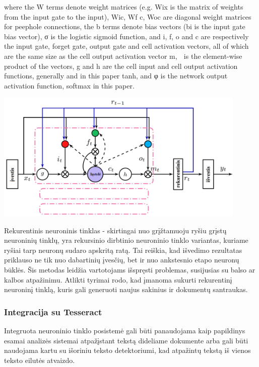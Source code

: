 \documentclass{VUMIFInfBakalaurinis}
\begin{document}
where the W terms denote weight matrices (e.g. Wix is the matrix of weights from the input gate to the input), Wic, Wf c, Woc are diagonal weight matrices for peephole connections, the b
terms denote bias vectors (bi is the input gate bias vector), σ is
the logistic sigmoid function, and i, f, o and c are respectively
the input gate, forget gate, output gate and cell activation vectors, all of which are the same size as the cell output activation
vector m,  is the element-wise product of the vectors, g and h
are the cell input and cell output activation functions, generally
and in this paper tanh, and φ is the network output activation
function, softmax in this paper.
\cite{sak2014long}
\begin{minipage}{\linewidth}
  \centering
  \includegraphics[width=12cm]{memory_block.png}
  \label{memory_block}
\end{minipage}

Rekurentinis neuroninis tinklas - skirtingai nuo grįžtamuoju ryšiu grįstų neuroninių tinklų, yra rekursinio 
dirbtinio neuroninio tinklo variantas, kuriame ryšiai tarp neuronų sudaro apskritą ratą. Tai reiškia,
kad išvedimo rezultatas priklauso ne tik nuo dabartinių įvesčių, bet ir nuo ankstesnio etapo neuronų būklės. 
Šis metodas leidžia vartotojams išspręsti problemas, susijusias su balso ar kalbos atpažinimu.
Atlikti tyrimai rodo, kad įmanoma sukurti rekurentinį neuroninį tinklą, kuris gali generuoti naujus sakinius ir dokumentų santraukas.

\subsubsection{Integracija su Tesseract}
Integruota neuroninio tinklo posistemė gali būti panaudojama kaip papildinys esamai analizės sistemai atpažįstant tekstą dideliame dokumente arba
gali būti naudojama kartu su išoriniu teksto detektoriumi, kad atpažintų tekstą iš vienos teksto eilutės atvaizdo.
\end{document}
